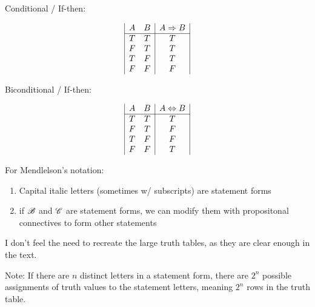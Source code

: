 Conditional / If-then:

\[
\begin{array}{|c c|c|}
A & B & A \imp B\\ %
\hline %
T & T & T\\
F & T & T\\
T & F & T\\
F & F & F\\
\end{array}
\]


Biconditional / If-then:

\[
\begin{array}{|c c|c|}
A & B & A \bicon B\\ %
\hline %
T & T & T\\
F & T & F\\
T & F & F\\
F & F & T\\
\end{array}
\]

For Mendlelson's notation:

\begin{enumerate}
  \item Capital italic letters (sometimes w/ subscripts) are statement forms
  \item if $\mathscr{B}$ and $\mathscr{C}$ are statement forms, we can modify them with propositonal connectives to form other statements
\end{enumerate}

I don't feel the need to recreate the large truth tables, as they are clear enough in the text.

Note: If there are $n$ distinct letters in a statement form, there are $2^n$ possible assignments of truth values to the statement letters, meaning $2^n$ rows in the truth table.
